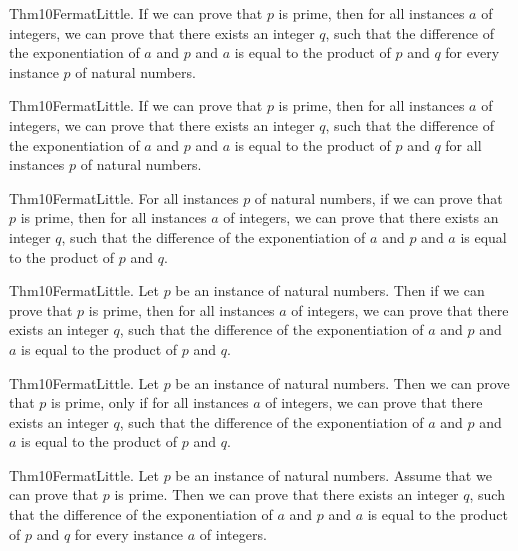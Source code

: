 \documentclass{article}
\begin{document}
Thm10FermatLittle. If we can prove that $p$ is prime, then for all instances $a$ of integers, we can prove that there exists an integer $q$, such that the difference of the exponentiation of $a$ and $p$ and $a$ is equal to the product of $p$ and $q$ for every instance $p$ of natural numbers.

Thm10FermatLittle. If we can prove that $p$ is prime, then for all instances $a$ of integers, we can prove that there exists an integer $q$, such that the difference of the exponentiation of $a$ and $p$ and $a$ is equal to the product of $p$ and $q$ for all instances $p$ of natural numbers.

Thm10FermatLittle. For all instances $p$ of natural numbers, if we can prove that $p$ is prime, then for all instances $a$ of integers, we can prove that there exists an integer $q$, such that the difference of the exponentiation of $a$ and $p$ and $a$ is equal to the product of $p$ and $q$.

Thm10FermatLittle. Let $p$ be an instance of natural numbers. Then if we can prove that $p$ is prime, then for all instances $a$ of integers, we can prove that there exists an integer $q$, such that the difference of the exponentiation of $a$ and $p$ and $a$ is equal to the product of $p$ and $q$.

Thm10FermatLittle. Let $p$ be an instance of natural numbers. Then we can prove that $p$ is prime, only if for all instances $a$ of integers, we can prove that there exists an integer $q$, such that the difference of the exponentiation of $a$ and $p$ and $a$ is equal to the product of $p$ and $q$.

Thm10FermatLittle. Let $p$ be an instance of natural numbers. Assume that we can prove that $p$ is prime. Then we can prove that there exists an integer $q$, such that the difference of the exponentiation of $a$ and $p$ and $a$ is equal to the product of $p$ and $q$ for every instance $a$ of integers.
\end{document}
